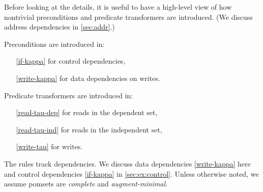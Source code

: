 Before looking at the details, it is useful to have a high-level view of how
nontrivial preconditions and predicate transformers are introduced.  (We
discuss address dependencies in \textsection\ref{sec:addr}.)
\begin{multicols}{2}
  Preconditions are introduced in: 
  \begin{itemize}
  \item[\eqref{if-kappa}] for control dependencies, 
  \item[\eqref{write-kappa}] for data dependencies on writes.
  \item[] 
  \end{itemize}
  \columnbreak

  Predicate transformers are introduced in:
  \begin{itemize}
  \item[\eqref{read-tau-dep}] for reads in the dependent set,
  \item[\eqref{read-tau-ind}] for reads in the independent set,
  \item[\eqref{write-tau}] for writes.
  \end{itemize}
\end{multicols}


The rules track dependencies.  We discuss data dependencies \eqref{write-kappa}
here and control dependencies \eqref{if-kappa} in
\textsection\ref{sec:ex:control}.  Unless otherwise noted, we assume pomsets
are \emph{complete} and \emph{augment-minimal}.  %

